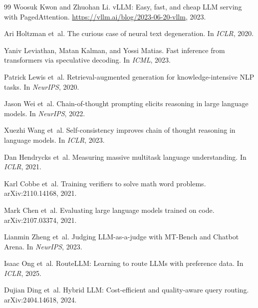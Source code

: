 \documentclass[11pt,a4paper]{article}
\begin{document}
\begin{thebibliography}{99}
Woosuk Kwon and Zhuohan Li.
\newblock vLLM: Easy, fast, and cheap LLM serving with PagedAttention.
\newblock \url{https://vllm.ai/blog/2023-06-20-vllm}, 2023.

Ari Holtzman et~al.
\newblock The curious case of neural text degeneration.
\newblock In \emph{ICLR}, 2020.

Yaniv Leviathan, Matan Kalman, and Yossi Matias.
\newblock Fast inference from transformers via speculative decoding.
\newblock In \emph{ICML}, 2023.

Patrick Lewis et~al.
\newblock Retrieval-augmented generation for knowledge-intensive NLP tasks.
\newblock In \emph{NeurIPS}, 2020.

Jason Wei et~al.
\newblock Chain-of-thought prompting elicits reasoning in large language models.
\newblock In \emph{NeurIPS}, 2022.

Xuezhi Wang et~al.
\newblock Self-consistency improves chain of thought reasoning in language models.
\newblock In \emph{ICLR}, 2023.

Dan Hendrycks et~al.
\newblock Measuring massive multitask language understanding.
\newblock In \emph{ICLR}, 2021.

Karl Cobbe et~al.
\newblock Training verifiers to solve math word problems.
\newblock arXiv:2110.14168, 2021.

Mark Chen et~al.
\newblock Evaluating large language models trained on code.
\newblock arXiv:2107.03374, 2021.

Lianmin Zheng et~al.
\newblock Judging LLM-as-a-judge with MT-Bench and Chatbot Arena.
\newblock In \emph{NeurIPS}, 2023.

Isaac Ong et~al.
\newblock RouteLLM: Learning to route LLMs with preference data.
\newblock In \emph{ICLR}, 2025.

Dujian Ding et~al.
\newblock Hybrid LLM: Cost-efficient and quality-aware query routing.
\newblock arXiv:2404.14618, 2024.

\end{thebibliography}
\end{document}
